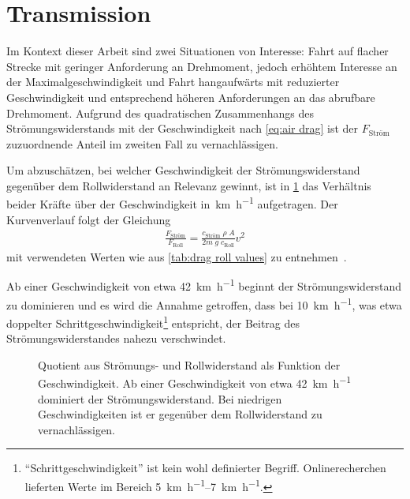 	\section{Transmission}\label{sec:transmission}
		Im Kontext dieser Arbeit sind zwei Situationen von Interesse: Fahrt auf flacher Strecke mit geringer Anforderung an Drehmoment, jedoch erhöhtem Interesse an der Maximalgeschwindigkeit und Fahrt hangaufwärts mit reduzierter Geschwindigkeit und entsprechend höheren Anforderungen an das abrufbare Drehmoment.
		Aufgrund des quadratischen Zusammenhangs des Strömungswiderstands mit der Geschwindigkeit nach \cref{eq:air drag} ist der \(F_\text{Ström}\) zuzuordnende Anteil im zweiten Fall zu vernachlässigen.

		Um abzuschätzen, bei welcher Geschwindigkeit der Strömungswiderstand gegenüber dem Rollwiderstand an Relevanz gewinnt, ist in \cref{fig:Froll vs Fdrag} das Verhältnis beider Kräfte über der Geschwindigkeit in~\unit{\kilo\metre\per\hour} aufgetragen.
		Der Kurvenverlauf folgt der Gleichung
		\begin{align}
			\frac{F_\text{Ström}}{F_\text{Roll}} = \frac{c_\text{Ström} \; \rho \; A}{2m \; g \; c_\text{Roll}} v^2
			\label{eq:F_drag F_roll ratio over speed}
		\end{align}
		mit verwendeten Werten wie aus \cref{tab:drag roll values} zu entnehmen~\cites{GESTIS.Luft}{air.drag.human.body.VANINGENSCHENAU1982}{material.advances.skateboarding.WATERMAN1978}.

		Ab einer Geschwindigkeit von etwa \qty{42}{\kilo\metre\per\hour} beginnt der Strömungswiderstand zu dominieren und es wird die Annahme getroffen, dass bei \qty{10}{\kilo\metre\per\hour}, was etwa doppelter Schrittgeschwindigkeit\footnote{\hspace{1mm} ``Schrittgeschwindigkeit'' ist kein wohl definierter Begriff. Onlinerecherchen lieferten Werte im Bereich \qtyrange{5}{7}{\kilo\metre\per\hour}.} entspricht, der Beitrag des Strömungswiderstandes nahezu verschwindet.
		\begin{figure}[h]
			\centering
			
			\caption[Quotient aus Strömungs- und Rollwiderstand als Funktion der Geschwindigkeit]{Quotient aus Strömungs- und Rollwiderstand als Funktion der Geschwindigkeit. Ab einer Geschwindigkeit von etwa \qty{42}{\kilo\metre\per\hour} dominiert der Strömungswiderstand. Bei niedrigen Geschwindigkeiten ist er gegenüber dem Rollwiderstand zu vernachlässigen.}%
			\label{fig:Froll vs Fdrag}
		\end{figure}

